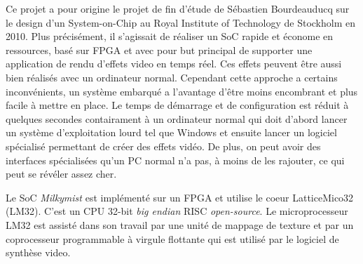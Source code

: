 Ce projet a pour origine le projet de fin d'étude de Sébastien Bourdeauducq \cite{BOURDEAUDUCQ} sur le design d'un System-on-Chip au Royal Institute of Technology de Stockholm en 2010. Plus précisément, il s'agissait de réaliser un SoC rapide et économe en ressources, basé sur FPGA et avec pour but principal de supporter une application de rendu d'effets video en temps réel. Ces effets peuvent être aussi bien réalisés avec un ordinateur normal. Cependant cette approche a certains inconvénients, un système embarqué a l'avantage d'être moins encombrant et plus facile à mettre en place. Le temps de démarrage et de configuration est réduit à  quelques secondes contairament à un ordinateur normal qui doit d'abord lancer un système d'exploitation lourd tel que Windows et ensuite lancer un logiciel spécialisé permettant de créer des effets vidéo. De plus, on peut avoir des interfaces spécialisées qu'un PC normal n'a pas, à moins de les rajouter, ce qui peut se révéler assez cher.


Le SoC \textit{Milkymist} est implémenté sur un FPGA et utilise le coeur LatticeMico32 (LM32)\cite{LATTICE}. C'est un CPU 32-bit \textit{big endian} RISC \textit{open-source}. Le microprocesseur LM32 est assisté dans son travail par une unité de mappage de texture et par un coprocesseur programmable à virgule flottante qui est utilisé par le logiciel de synthèse video.
